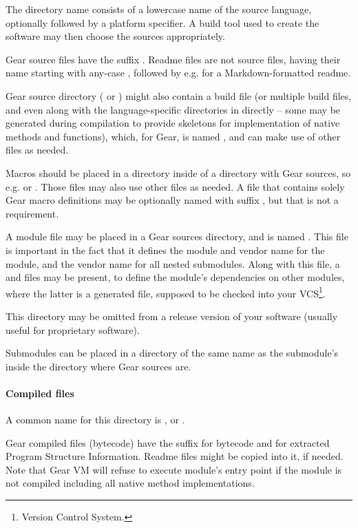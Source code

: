 The directory name consists of a lowercase name of the source language, optionally followed by a platform specifier. A build tool used to create the software may then choose the sources appropriately. 

Gear source files have the suffix . Readme files are not source files, having their name starting with any-case , followed by e.g.  for a Markdown-formatted readme. 

Gear source directory ( or ) might also contain a build file (or multiple build files, and even along with the language-specific directories in  directly -- some may be generated during compilation to provide skeletons for implementation of native methods and functions), which, for Gear, is named , and can make use of other files as needed. 

Macros should be placed in a  directory inside of a directory with Gear sources, so e.g.  or . Those files may also use other files as needed. A file that contains solely Gear macro definitions may be optionally named with suffix , but that is not a requirement. 

A module file may be placed in a Gear sources directory, and is named . This file is important in the fact that it defines the module and vendor name for the module, and the vendor name for all nested submodules. Along with this file, a  and  files may be present, to define the module's dependencies on other modules, where the latter is a generated file, supposed to be checked into your VCS\footnote{Version Control System.}.

This directory may be omitted from a release version of your software (usually useful for proprietary software). 

Submodules can be placed in a directory of the same name as the submodule's inside the directory where Gear sources are. 

\paragraph{Compiled files}
A common name for this directory is , or .

Gear compiled files (bytecode) have the suffix  for bytecode and  for extracted Program Structure Information. Readme files might be copied into it, if needed. Note that Gear VM will refuse to execute module's entry point if the module is not compiled including all native method implementations. 

